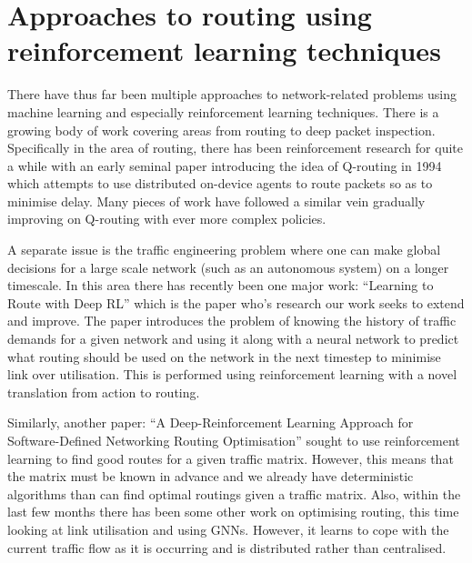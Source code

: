 \section{Approaches to routing using reinforcement learning techniques}

There have thus far been multiple approaches to network-related problems using machine learning and especially reinforcement learning techniques. There is a growing body of work covering areas from routing to deep packet inspection. Specifically in the area of routing, there has been reinforcement research for quite a while with an early seminal paper introducing the idea of Q-routing in 1994\cite{boyan1994packet} which attempts to use distributed on-device agents to route packets so as to minimise delay. Many pieces of work have followed a similar vein gradually improving on Q-routing with ever more complex policies\cite{you2019toward,Ali2019HierarchicalDD}.

A separate issue is the traffic engineering problem where one can make global decisions for a large scale network (such as an autonomous system) on a longer timescale. In this area there has recently been one major work: ``Learning to Route with Deep RL''\cite{valadarsky2017learning} which is the paper who's research our work seeks to extend and improve. The paper introduces the problem of knowing the history of traffic demands for a given network and using it along with a neural network to predict what routing should be used on the network in the next timestep to minimise link over utilisation. This is performed using reinforcement learning with a novel translation from action to routing.

Similarly, another paper: ``A Deep-Reinforcement Learning Approach for Software-Defined Networking Routing Optimisation''\cite{stampa2017deep} sought to use reinforcement learning to find good routes for a given traffic matrix. However, this means that the matrix must be known in advance and we already have deterministic algorithms than can find optimal routings given a traffic matrix. Also, within the last few months there has been some other work on optimising routing, this time looking at link utilisation and using GNNs\cite{Sawada2020NetworkRO}. However, it learns to cope with the current traffic flow as it is occurring and is distributed rather than centralised.
